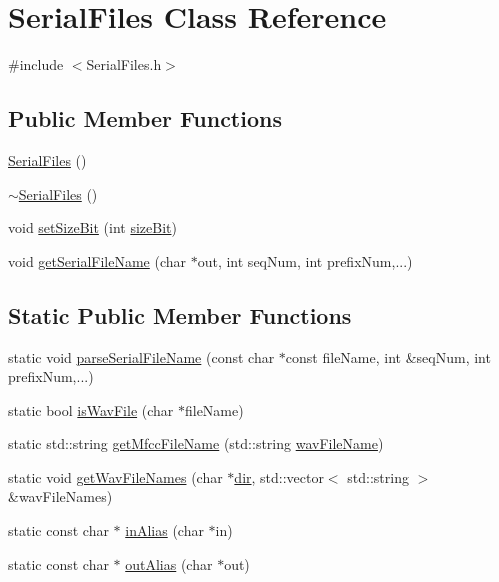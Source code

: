 \hypertarget{class_serial_files}{\section{Serial\+Files Class Reference}
\label{class_serial_files}
}


{\ttfamily \#include $<$Serial\+Files.\+h$>$}

\subsection*{Public Member Functions}
\begin{DoxyCompactItemize}
\item 
\hyperlink{class_serial_files_a133f17022332bcab7d068878554572dd}{Serial\+Files} ()
\item 
\hyperlink{class_serial_files_a04fb86b51bf96e93a49961585d547566}{$\sim$\+Serial\+Files} ()
\item 
void \hyperlink{class_serial_files_aad5577c514c7203f95453233f30d6131}{set\+Size\+Bit} (int \hyperlink{class_serial_files_acabed1bad4c479b8ce9e99749a540493}{size\+Bit})
\item 
void \hyperlink{class_serial_files_ac706daaeaf83b0411c5f7408a828923c}{get\+Serial\+File\+Name} (char $\ast$out, int seq\+Num, int prefix\+Num,...)
\end{DoxyCompactItemize}
\subsection*{Static Public Member Functions}
\begin{DoxyCompactItemize}
\item 
static void \hyperlink{class_serial_files_a4cc2ec8a6e28989538a41a6b1c19ddfa}{parse\+Serial\+File\+Name} (const char $\ast$const file\+Name, int \&seq\+Num, int prefix\+Num,...)
\item 
static bool \hyperlink{class_serial_files_ac1ff50efbc3b673270ce8555bf0b6299}{is\+Wav\+File} (char $\ast$file\+Name)
\item 
static std\+::string \hyperlink{class_serial_files_aa4d5689296f1c4cbae8e0094c2a3f45d}{get\+Mfcc\+File\+Name} (std\+::string \hyperlink{pro2__demo_8cpp_ad9a59c7128669a882a4be4fa879c41f7}{wav\+File\+Name})
\item 
static void \hyperlink{class_serial_files_a18cca2d08b8b0bff158a7a2065e7e24d}{get\+Wav\+File\+Names} (char $\ast$\hyperlink{recorder_8cpp_a076467fbbccdf16ebbc375c94af4e31c}{dir}, std\+::vector$<$ std\+::string $>$ \&wav\+File\+Names)
\item 
static const char $\ast$ \hyperlink{class_serial_files_ac7c1436624bcf28c90c3a47985e67f48}{in\+Alias} (char $\ast$in)
\item 
static const char $\ast$ \hyperlink{class_serial_files_accb34f24ea0dc1c9ff1bb3a6c46b9e2c}{out\+Alias} (char $\ast$out)
\end{DoxyCompactItemize}
